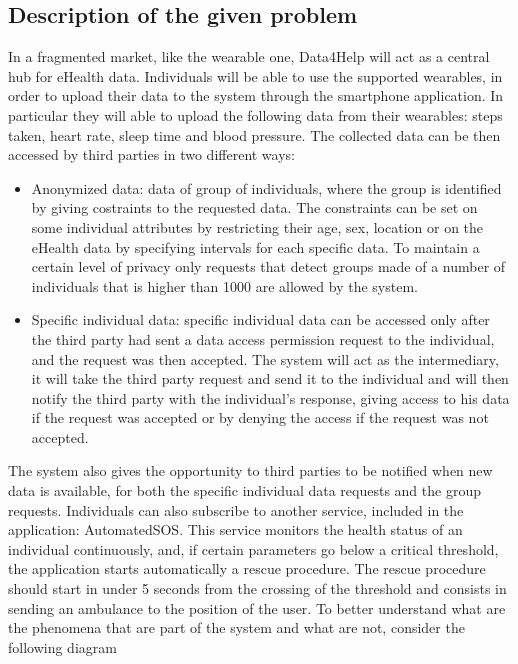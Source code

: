 \subsection{Description of the given problem}
In a fragmented market, like the wearable one, Data4Help will act as a central hub for eHealth data.
Individuals will be able to use the supported wearables, in order to upload their data to the system through the smartphone application. In particular they will able to upload the following data from their wearables: steps taken, heart rate, sleep time and blood pressure.
\givespace
The collected data can be then accessed by third parties in two different ways:
\begin{itemize}
\item Anonymized data: data of group of individuals, where the group is identified by giving costraints to the requested data. The constraints can be set on some individual attributes by restricting their age, sex, location or on the eHealth data by specifying intervals for each specific data. To maintain a certain level of privacy only requests that detect groups made of a number of individuals that is higher than 1000 are allowed by the system.
\item Specific individual data: specific individual data can be accessed only after the third party had sent a data access permission request to the individual, and the request was then accepted. The system will act as the intermediary, it will take the third party request and send it to the individual and will then notify the third party with the individual's response, giving access to his data if the request was accepted or by denying the access if the request was not accepted.
\end{itemize}
The system also gives the opportunity to third parties to be notified when new data is available, for both the specific individual data requests and the group requests.
\givespace
Individuals can also subscribe to another service, included in the application: AutomatedSOS. This service monitors the health status of an individual continuously, and, if certain parameters go below a critical threshold, the application starts automatically a rescue procedure. The rescue procedure should start in under 5 seconds from the crossing of the threshold and consists in sending an ambulance to the position of the user.
\givespace
To better understand what are the phenomena that are part of the system and what are not, consider the following diagram
